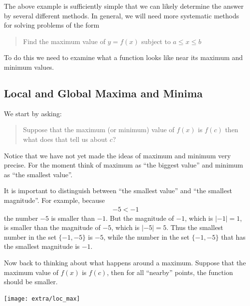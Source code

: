 The above example is sufficiently simple that we can likely determine the answer by
several different methods. In general, we will need more systematic methods for solving
problems of the form
\begin{quote}
 Find the maximum value of $y = f(x)$ subject to $a \leq x \leq b$
\end{quote}
To do this we need to examine what a function looks like near its
maximum and minimum values.

\subsection{Local and Global Maxima and Minima}\label{ssec maxmin}
We start by asking:
\begin{quote}
Suppose that the maximum (or minimum) value of $f(x)$ is $f(c)$ then what does that tell
us about $c$?
\end{quote}
Notice that we have not yet made the ideas of maximum and minimum very precise.
For the moment think of maximum as ``the biggest value'' and minimum as
``the smallest value''.

\begin{warning}
It is important to distinguish between ``the smallest value'' and ``the smallest
magnitude''. For example, because
\begin{align*}
  -5 < -1
\end{align*}
the number $-5$ is smaller than $-1$. But the magnitude of $-1$, which is $|-1|=1$, is
smaller than the magnitude of $-5$, which is $|-5|=5$. Thus the smallest number in the set
$\{-1, -5\}$ is $-5$, while the number in the set $\{-1,-5\}$ that has the smallest
magnitude is $-1$.
\end{warning}

Now back to thinking about what happens around a maximum. Suppose that the maximum value
of $f(x)$ is $f(c)$, then for all ``nearby'' points, the function should be smaller.
\begin{efig}
 \begin{center}
  \texttt{[image: extra/loc\_max]}
 \end{center}
\end{efig}

